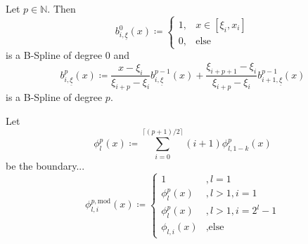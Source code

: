 \documentclass[
  a4paper,  %
  twoside,  %
  bibliography=totoc,
  headsepline,
  cleardoublepage=empty,
  parskip=half,
  draft=false
]{scrbook}
\begin{document}
\begin{definition}[B-Splines]
Let $p \in \mathds{N}$.
Then
\begin{equation}
b^0_{i,\underline{\xi}}(x) \coloneqq
\begin{cases}
    1, & x \in [\xi_i,x_i] \\
   0, & \text{else}
\end{cases}
\end{equation}
is a B-Spline of degree $0$ and
\begin{equation}
b_{i,\underline{\xi}}^p(x) \coloneqq \frac{x - \xi_i}{\xi_{i + p} - \xi_i} b_{i,\underline{\xi}}^{p-1}(x) + \frac{\xi_{i+p+1} - \xi_i}{\xi_{i + p} - \xi_i} b_{i+1,\underline{\xi}}^{p-1}(x) 
\end{equation}
is a B-Spline of degree $p$.
\end{definition}

\begin{definition}
Let
\begin{equation}
\phi_l^p(x) \coloneqq \sum_{i=0}^{\lceil (p+1)/2 \rceil} (i+1) \phi^p_{l,1-k}(x)
\end{equation}
be the boundary...
\begin{equation}
\phi^{p,\text{mod}}_{l,i}(x) \coloneqq
\begin{cases}
1 &, l=1\\
\phi^p_{l}(x)&, l>1, i=1\\
\phi^p_{l}(x)&, l>1, i=2^l - 1\\
\phi_{l,i}(x)&, \text{else}
\end{cases}
\nonumber
\end{equation}
\end{definition}

\newpage
\printbibliography


\pagestyle{empty}
\renewcommand*{\chapterpagestyle}{empty}
\Versicherung
\end{document}
